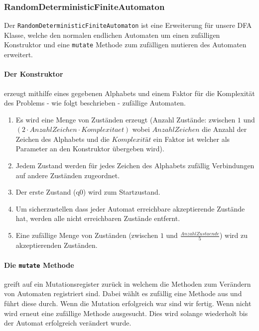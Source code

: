 \subsubsection{RandomDeterministicFiniteAutomaton}
\label{subsec:RandomDeterministicFiniteAutomaton}
Der \lstinline$RandomDeterministicFiniteAutomaton$ ist eine Erweiterung für unsere DFA Klasse, welche den normalen endlichen Automaten um einen zufälligen Konstruktor und eine \lstinline$mutate$ Methode zum zufälligen mutieren des Automaten erweitert.

\paragraph{Der Konstruktor} erzeugt mithilfe eines gegebenen Alphabets und einem Faktor für die Komplexität des Problems - wie folgt beschrieben - zufällige Automaten.
\begin{enumerate}
  \item Es wird eine Menge von Zuständen erzeugt (Anzahl Zustände: zwischen $1$ und $(2 \cdot AnzahlZeichen \cdot Komplexitaet)$ wobei $AnzahlZeichen$ die Anzahl der Zeichen des Alphabets und die $Komplexität$ ein Faktor ist welcher als Parameter an den Konstruktor übergeben wird).
  \item Jedem Zustand werden für jedes Zeichen des Alphabets zufällig Verbindungen auf andere Zuständen zugeordnet.
  \item Der erste Zustand (q0) wird zum Startzustand.
  \item Um sicherzustellen dass jeder Automat erreichbare akzeptierende Zustände hat, werden alle nicht erreichbaren Zustände entfernt.
  \item Eine zufällige Menge von Zuständen (zwischen $1$ und $\frac{AnzahlZustaende}{5}$) wird zu akzeptierenden Zuständen.
\end{enumerate}

\paragraph{Die \lstinline$mutate$ Methode} greift auf ein Mutationsregister zurück in welchem die Methoden zum Verändern von Automaten registriert sind. Dabei wählt es zufällig eine Methode aus und führt diese durch. Wenn die Mutation erfolgreich war sind wir fertig. Wenn nicht wird erneut eine zufällige Methode ausgesucht. Dies wird solange wiederholt bis der Automat erfolgreich verändert wurde.

